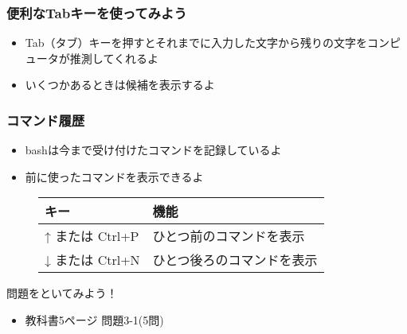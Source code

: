 \begin{frame}
    \frametitle{便利なTabキーを使ってみよう}
    \begin{itemize}
        \item Tab（タブ）キーを押すとそれまでに入力した文字から残りの文字をコンピュータが推測してくれるよ
        \item いくつかあるときは候補を表示するよ
    \end{itemize}
    \begin{figure}[h]
        \centering
        
    \end{figure}
\end{frame}

\begin{frame}
    \frametitle{コマンド履歴}
    \begin{itemize}
        \item bashは今まで受け付けたコマンドを記録しているよ
        \item 前に使ったコマンドを表示できるよ
    \end{itemize}
    \begin{figure}[h]
        \center
        \begin{tabular}{ll}\hline
          キー & 機能 \\ \hline
          ↑ または Ctrl+P & ひとつ前のコマンドを表示\\
          ↓ または Ctrl+N & ひとつ後ろのコマンドを表示\\ \hline
        \end{tabular}
    \end{figure}
\end{frame}

\begin{frame}
    \begin{exampleblock}{問題をといてみよう！}
        \begin{itemize}
            \item 教科書5ページ 問題3-1(5問)
        \end{itemize}
    \end{exampleblock} 
\end{frame}

